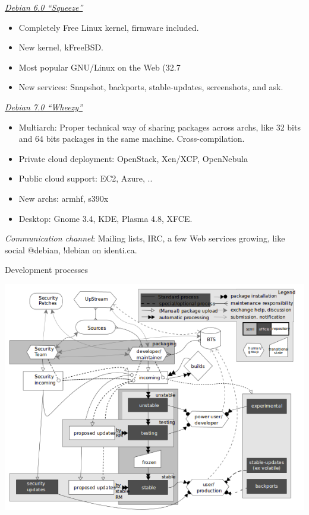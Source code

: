 \documentclass[11pt]{article}
\begin{document}
\underline{\emph{Debian 6.0 ``Squeeze''}}
\begin{itemize}
	\item Completely Free Linux kernel, firmware included.
	\item New kernel, kFreeBSD.
	\item Most popular GNU/Linux on the Web (32.7%
	\item New services: Snapshot, backports, stable-updates, screenshots, and ask.
\end{itemize}

\underline{\emph{Debian 7.0  ``Wheezy''}}
\begin{itemize}
	\item Multiarch: 	Proper technical way of sharing packages across archs, like 32 bits and 64 bits packages in the same machine. Cross-compilation.
	\item Private cloud deployment:  OpenStack, Xen/XCP, OpenNebula
	\item Public cloud support: EC2, Azure, ..
	\item New archs: armhf, s390x
	\item Desktop: Gnome 3.4, KDE, Plasma 4.8, XFCE.
\end{itemize}

\emph{Communication channel}: Mailing lists, IRC, a few Web services growing, like social @debian, !debian on identi.ca.

Development processes

\hfill\includegraphics[scale=0.6]{img/DebianDevelopmentProcess}\hspace*{\fill}
	
\end{document}
